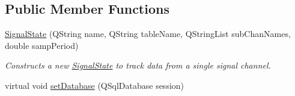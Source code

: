 \subsection*{Public Member Functions}
\begin{DoxyCompactItemize}
\item 
\hyperlink{class_picto_1_1_signal_state_aad43f6d1199fa09a1ec269b9af99363e}{Signal\-State} (Q\-String name, Q\-String table\-Name, Q\-String\-List sub\-Chan\-Names, double samp\-Period)
\begin{DoxyCompactList}\small\item\em Constructs a new \hyperlink{class_picto_1_1_signal_state}{Signal\-State} to track data from a single signal channel. \end{DoxyCompactList}\item 
\hypertarget{class_picto_1_1_signal_state_a8121bf75835442a301b9951cc2fafa9c}{virtual void \hyperlink{class_picto_1_1_signal_state_a8121bf75835442a301b9951cc2fafa9c}{set\-Database} (Q\-Sql\-Database session)}\label{class_picto_1_1_signal_state_a8121bf75835442a301b9951cc2fafa9c}


\end{DoxyCompactItemize}
